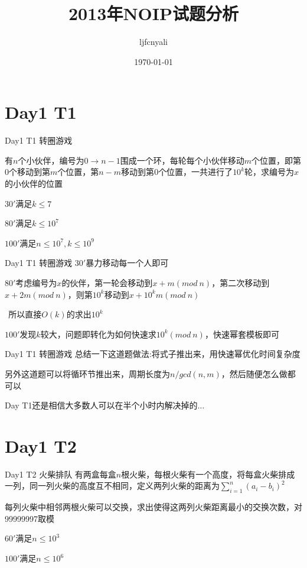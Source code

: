 \documentclass[10pt]{beamer}
\title{2013年NOIP试题分析}
\date{\today}
\author{ljfcnyali}
\begin{document}
  \maketitle
  \section{Day1 T1}

  \begin{frame}{Day1 T1 转圈游戏}
    \par 有$n$个小伙伴，编号为$0\rightarrow n-1$围成一个环，每轮每个小伙伴移动$m$个位置，即第$0$个移动到第$m$个位置，第$n-m$移动到第$0$个位置，一共进行了$10^k$轮，求编号为$x$的小伙伴的位置
    \par $30'$满足$k\leq 7$
    \par $80'$满足$k\leq 10^7$
    \par $100'$满足$n\leq 10^7,k\leq 10^9$
  \end{frame}

  \begin{frame}{Day1 T1 转圈游戏}
     $30'$暴力移动每一个人即可
    
     $80'$考虑编号为$x$的伙伴，第一轮会移动到$x+m(mod\ n)$，第二次移动到$x+2m(mod\ n)$，则第$10^k$移动到$x+10^k m(mod\ n)$
    
     $\ \ $所以直接$O(k)$的求出$10^k$
    
     $100'$发现$k$较大，问题即转化为如何快速求$10^k(mod\ n)$，快速幂套模板即可
  \end{frame}

  \begin{frame}{Day1 T1 转圈游戏}
     总结一下这道题做法:将式子推出来，用快速幂优化时间复杂度

     另外这道题可以将循环节推出来，周期长度为$n/gcd(n,m)$，然后随便怎么做都可以

     Day T1还是相信大多数人可以在半个小时内解决掉的$\dots$
  \end{frame}

  \section{Day1 T2}

  \begin{frame}{Day1 T2 火柴排队}
     有两盒每盒$n$根火柴，每根火柴有一个高度，将每盒火柴排成一列，同一列火柴的高度互不相同，定义两列火柴的距离为$\sum_{i=1}^{n}(a_i-b_i)^2$

     每列火柴中相邻两根火柴可以交换，求出使得这两列火柴距离最小的交换次数，对99999997取模

     $60'$满足$n\leq 10^3$

     $100'$满足$n\leq 10^6$
  \end{frame}
\end{document}
